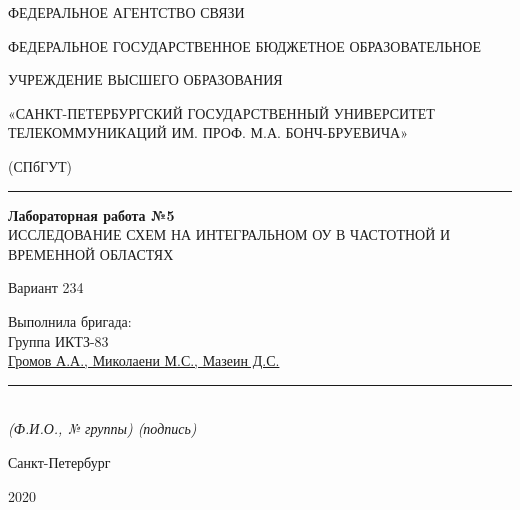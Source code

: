 \documentclass[a4paper,14pt]{extarticle}
\begin{document}
    \begin{center}
        \thispagestyle{empty}
        \begin{singlespace}
        ФЕДЕРАЛЬНОЕ АГЕНТСТВО СВЯЗИ

        ФЕДЕРАЛЬНОЕ ГОСУДАРСТВЕННОЕ БЮДЖЕТНОЕ ОБРАЗОВАТЕЛЬНОЕ

        УЧРЕЖДЕНИЕ ВЫСШЕГО ОБРАЗОВАНИЯ

        «САНКТ-ПЕТЕРБУРГСКИЙ ГОСУДАРСТВЕННЫЙ УНИВЕРСИТЕТ ТЕЛЕКОММУНИКАЦИЙ ИМ. ПРОФ. М.А. БОНЧ-БРУЕВИЧА»

        (СПбГУТ)
        \end{singlespace}
        \vspace{-1ex}
        \rule{\textwidth}{0.4pt}
        \vspace{-5ex}

        \vspace{100px}
        \textbf{Лабораторная работа №5}\\
        ИССЛЕДОВАНИЕ СХЕМ НА ИНТЕГРАЛЬНОМ ОУ В ЧАСТОТНОЙ И ВРЕМЕННОЙ ОБЛАСТЯХ
        \begin{center}
            Вариант 234
        \end{center}
    \vspace{100px}
    \end{center}
    \vspace{4ex}
    \begin{flushright}
    \parbox{12 cm}{
    \begin{flushleft}
        Выполнила бригада:\\
        Группа ИКТЗ-83\\
        \underline{Громов А.А., Миколаени М.С., Мазеин Д.С.} \hfill \rule[-0.85ex]{0.09\textwidth}{0.6pt}\\
        \vspace{-1ex}
        \footnotesize \textit{ (Ф.И.О., № группы) \hfill (подпись)} \normalsize


    \end{flushleft}
    }
    \end{flushright}
    \begin{center}
        \vfill
        Санкт-Петербург

        2020

    \end{center}
    \newpage
\end{document}
